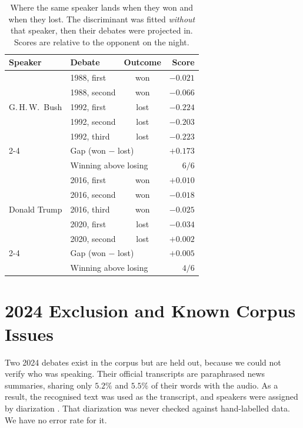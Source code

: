 \documentclass[pdflatex,sn-apa]{sn-jnl}%
\begin{document}
\begin{table}[!htbp]
\centering
\caption{Where the same speaker lands when they won and when they lost.
The discriminant was fitted \emph{without} that speaker, then their debates
were projected in. Scores are relative to the opponent on the night.}
\label{s:tab:within}

\footnotesize
\setlength{\tabcolsep}{5pt}
\renewcommand{\arraystretch}{1.08}

\begin{tabular}{llcr}
\toprule
\textbf{Speaker} & \textbf{Debate} & \textbf{Outcome} & \textbf{Score} \\
\midrule

\multirow{5}{*}{G.\,H.\,W.\ Bush}
 & 1988, first  & won  & $-0.021$ \\
 & 1988, second & won  & $-0.066$ \\
 & 1992, first  & lost & $-0.224$ \\
 & 1992, second & lost & $-0.203$ \\
 & 1992, third  & lost & $-0.223$ \\
\cmidrule(lr){2-4}
 & \multicolumn{2}{l}{Gap (won $-$ lost)} & $+0.173$ \\
 & \multicolumn{2}{l}{Winning above losing} & $6/6$ \\

\midrule

\multirow{5}{*}{Donald Trump}
 & 2016, first  & won  & $+0.010$ \\
 & 2016, second & won  & $-0.018$ \\
 & 2016, third  & won  & $-0.025$ \\
 & 2020, first  & lost & $-0.034$ \\
 & 2020, second & lost & $+0.002$ \\
\cmidrule(lr){2-4}
 & \multicolumn{2}{l}{Gap (won $-$ lost)} & $+0.005$ \\
 & \multicolumn{2}{l}{Winning above losing} & $4/6$ \\

\bottomrule
\end{tabular}
\end{table}
\FloatBarrier

\section{2024 Exclusion and Known Corpus Issues}
\label{s:known}

Two 2024 debates exist in the corpus but are held out, because we could
not verify who was speaking. Their official transcripts are paraphrased
news summaries, sharing only $5.2\%$ and $5.5\%$ of their words with the
audio. As a result, the recognised text was used as the transcript, and
speakers were assigned by diarization \citep{bredin2023pyannote}. That
diarization was never checked against hand-labelled data. We have no
error rate for it.
\end{document}
